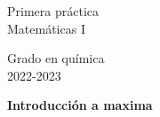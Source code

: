 \documentclass{article}
\title{\tit}
\author{}
\date{}
\def\tit{Introducción a maxima}
\begin{document}
\noindent\begin{minipage}{.4\textwidth}
\large
Primera práctica\\
Matemáticas I
\end{minipage}
\hfill
\begin{minipage}{.4\textwidth}
\large
\flushright
Grado en química\\
2022-2023
\end{minipage}

\bigskip

\begin{center}
\textbf{
\huge
\tit
}
\end{center}










\end{document}
